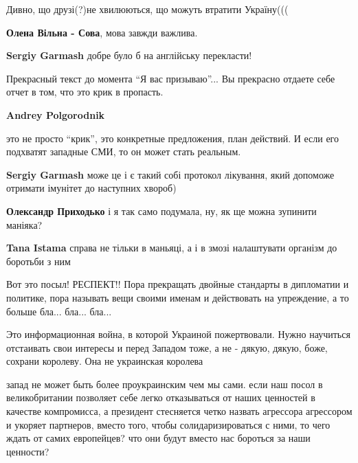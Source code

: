 \begin{itemize}
\begin{itemize}
Дивно, що друзі(?)не хвилюються, що можуть втратити Україну(((

\textbf{Олена Вільна - Сова}, мова завжди важлива.

\textbf{Sergiy Garmash} добре було б на англійську перекласти!
\end{itemize} %


Прекрасный текст до момента \enquote{Я вас призываю}... Вы прекрасно отдаете себе отчет
в том, что это крик в пропасть.

\begin{itemize} %
\textbf{Andrey Polgorodnik} 

это не просто \enquote{крик}, это конкретные предложения, план действий. И если его
подхватят западные СМИ, то он может стать реальным.

\textbf{Sergiy Garmash} може це і є такий собі протокол лікування, який допоможе отримати імунітет до наступних хвороб)

\textbf{Олександр Приходько} і я так само подумала, ну, як ще можна зупинити маніяка?

\textbf{Tana Istama} справа не тільки в маньяці, а і в змозі налаштувати організм до боротьби з ним
\end{itemize} %


Вот это посыл! РЕСПЕКТ!! Пора прекращать двойные стандарты в дипломатии и
политике, пора называть вещи своими именам и действовать на упреждение, а то
больше бла... бла... бла...


Это информационная война, в которой Украиной пожертвовали. Нужно научиться
отстаивать свои интересы и перед Западом тоже, а не - дякую, дякую, боже,
сохрани королеву. Она не украинская королева


запад не может быть более проукраинским чем мы сами. если наш посол в
великобритании позволяет себе легко отказываться от наших ценностей в качестве
компромисса, а президент стесняется четко назвать агрессора агрессором и
укоряет партнеров, вместо того, чтобы солидаризироваться с ними, то чего ждать
от самих европейцев? что они будут вместо нас бороться за наши ценности?


\end{itemize}
